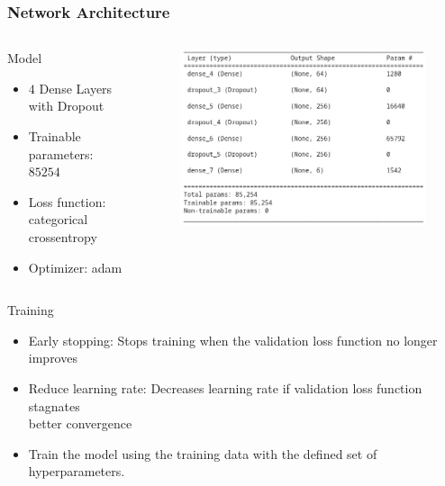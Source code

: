 \begin{frame}
    \frametitle{Network Architecture}
    
    \begin{columns}[T]
        \begin{column}{0.4\textwidth}
            \begin{alertblock}{Model}
                \begin{itemize}
                    \item $\num{4}$ Dense Layers with Dropout
                    \item Trainable parameters: $\num{85254}$
                    \item Loss function: categorical crossentropy
                    \item Optimizer: adam
                \end{itemize}    
            \end{alertblock}
        \end{column}
        \begin{column}{0.6\textwidth}
            \begin{figure}
                \hspace*{-1.7cm}
                \includegraphics[width=1\textwidth]{../figures/model_summary.png}
            \end{figure}
        \end{column}
    \end{columns}

    \begin{alertblock}{Training}
        \begin{itemize}
            \item Early stopping: Stops training when the validation loss function no longer improves
            \item Reduce learning rate: Decreases learning rate if validation loss function stagnates \\
            \to better convergence
            \item Train the model using the training data with the defined set of hyperparameters.
        \end{itemize}  
    \end{alertblock}
    
\end{frame}
    
